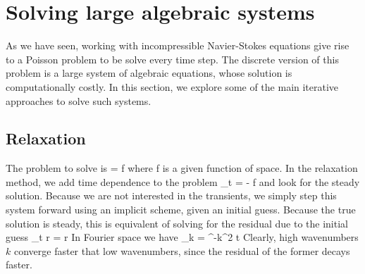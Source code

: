 \documentclass[11pt]{article}
\begin{document}
\section{Solving large algebraic systems}
As we have seen, working with incompressible Navier-Stokes equations give rise to a Poisson 
 problem to be solve every time step. The discrete version of this problem is a large  system
  of algebraic equations, whose solution is computationally costly. In this section, we explore
  some of the main iterative approaches to solve such systems.

\subsection{Relaxation}
    The problem to solve is
    \beq
        \label{eq:poisson}
        \lap \phi = f\com
    \eeq
    where f is a given function of space. In the relaxation method, we add time dependence to
     the problem
    \beq
        \label{eq:poisson_time}
        \p_t \phi = \lap \phi - f\com
    \eeq
    and look for the steady solution. Because we are not interested in the transients, we simply
    step this system forward using an implicit scheme, given an initial guess. Because the true
     solution is steady, this is equivalent of solving for the residual due to the initial guess
     \beq
        \p_t r = \lap r\per
     \eeq
    In Fourier space we have
    \beq
        _k =  \ee^{-k^2 t}\per
    \eeq
    Clearly, high wavenumbers $k$ converge faster that low wavenumbers, since the residual of the
     former decays faster.
\end{document}
